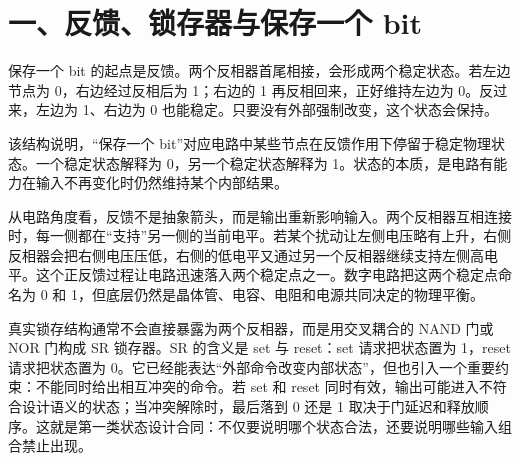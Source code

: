 \section{一、反馈、锁存器与保存一个 bit}

保存一个 bit 的起点是反馈。两个反相器首尾相接，会形成两个稳定状态。若左边节点为 0，右边经过反相后为 1；右边的 1 再反相回来，正好维持左边为 0。反过来，左边为 1、右边为 0 也能稳定。只要没有外部强制改变，这个状态会保持。

该结构说明，“保存一个 bit”对应电路中某些节点在反馈作用下停留于稳定物理状态。一个稳定状态解释为 0，另一个稳定状态解释为 1。状态的本质，是电路有能力在输入不再变化时仍然维持某个内部结果。

从电路角度看，反馈不是抽象箭头，而是输出重新影响输入。两个反相器互相连接时，每一侧都在“支持”另一侧的当前电平。若某个扰动让左侧电压略有上升，右侧反相器会把右侧电压压低，右侧的低电平又通过另一个反相器继续支持左侧高电平。这个正反馈过程让电路迅速落入两个稳定点之一。数字电路把这两个稳定点命名为 0 和 1，但底层仍然是晶体管、电容、电阻和电源共同决定的物理平衡。

真实锁存结构通常不会直接暴露为两个反相器，而是用交叉耦合的 NAND 门或 NOR 门构成 SR 锁存器。SR 的含义是 set 与 reset：set 请求把状态置为 1，reset 请求把状态置为 0。它已经能表达“外部命令改变内部状态”，但也引入一个重要约束：不能同时给出相互冲突的命令。若 set 和 reset 同时有效，输出可能进入不符合设计语义的状态；当冲突解除时，最后落到 0 还是 1 取决于门延迟和释放顺序。这就是第一类状态设计合同：不仅要说明哪个状态合法，还要说明哪些输入组合禁止出现。


